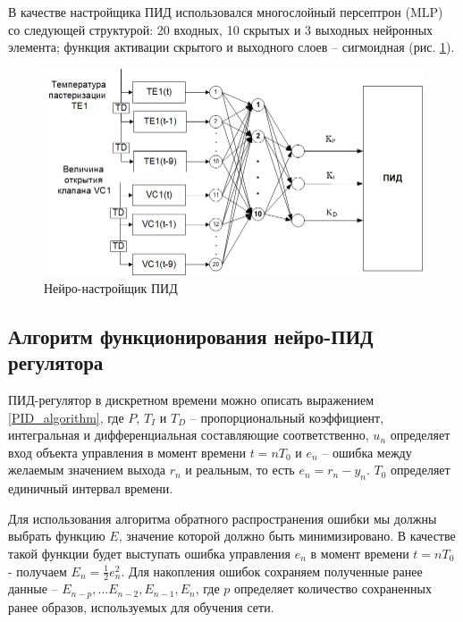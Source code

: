 В качестве настройщика ПИД использовался многослойный персептрон (MLP) со следующей структурой: 20 входных, 10 скрытых и 3 выходных нейронных элемента; функция активации скрытого и выходного слоев – сигмоидная (рис. \ref{fig:PID_neuro_tuner}).

\begin{figure}[H]
    \centering
    \includegraphics[width=\textwidth]{images/chapter_2/Нейро-настройщик ПИД.png}
    \caption{Нейро-настройщик ПИД}
    \label{fig:PID_neuro_tuner}
\end{figure}

\subsection{Алгоритм функционирования нейро-ПИД регулятора}

ПИД-регулятор в дискретном времени можно описать выражением \ref{PID_algorithm}, где $P$, $T_I$ и $T_D$ – пропорциональный коэффициент, интегральная и дифференциальная составляющие соответственно, $u_n$ определяет вход объекта управления в момент времени $t = n T_0$ и $e_n$ – ошибка между желаемым значением выхода $r_n$ и реальным, то есть $e_n = r_n - y_n$. $T_0$ определяет единичный интервал времени.

Для использования алгоритма обратного распространения ошибки мы должны выбрать функцию $E$, значение которой должно быть минимизировано. В качестве такой функции будет выступать ошибка управления $e_n$ в момент времени $t = n T_0$ - получаем $E_n = \frac{1}{2}e_n^2$.
Для накопления ошибок сохраняем полученные ранее данные – $E_{n-p},...E_{n-2},E_{n-1},E_n$, где $p$ определяет количество сохраненных ранее образов, используемых для обучения сети.

